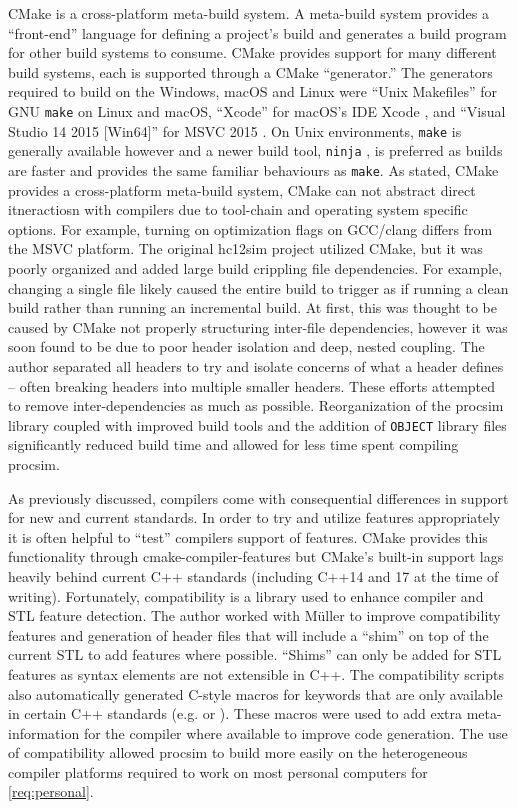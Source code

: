 CMake \cite{Kitware:CMake} is a cross-platform meta-build system. A meta-build system provides a ``front-end'' language for defining a project's build and generates a build program for other build systems to consume. CMake provides support for many different build systems, each is supported through a CMake ``generator.'' The generators required to build on the Windows, macOS and Linux were ``Unix Makefiles'' for GNU \texttt{make} \cite{GNU:Make} on Linux and macOS, ``Xcode'' for macOS's IDE Xcode \cite{Apple:Xcode}, and ``Visual Studio 14 2015 [Win64]'' for MSVC 2015 \cite{CMake:Generators}. On Unix environments, \texttt{make} is generally available however and a newer build tool, \texttt{ninja} \cite{NinjaBuild}, is preferred as builds are faster and provides the same familiar behaviours as \texttt{make}. As stated, CMake provides a cross-platform meta-build system, CMake can not abstract direct itneractiosn with compilers due to tool-chain and operating system specific options. For example, turning on optimization flags on GCC/clang differs from the MSVC platform. The original hc12sim project utilized CMake, but it was poorly organized and added large build crippling file dependencies. For example, changing a single file likely caused the entire build to trigger as if running a clean build rather than running an incremental build. At first, this was thought to be caused by CMake not properly structuring inter-file dependencies, however it was soon found to be due to poor header isolation and deep, nested coupling. The author separated all headers to try and isolate concerns of what a header defines -- often breaking headers into multiple smaller headers. These efforts attempted to remove inter-dependencies as much as possible. Reorganization of the procsim library coupled with improved build tools and the addition of \texttt{OBJECT} library files \cite{CMake:add_library} significantly reduced build time and allowed for less time spent compiling procsim. 

As previously discussed, compilers come with consequential differences in support for new and current standards. In order to try and utilize features appropriately it is often helpful to ``test'' compilers support of features. CMake provides this functionality through cmake-compiler-features \cite{CMake:compile-features} but CMake's built-in support lags heavily behind current C++ standards (including C++14 and 17 at the time of writing). Fortunately, compatibility \cite{CMakeCompatibility} is a library used to enhance compiler and STL feature detection. The author worked with M\"uller to improve compatibility features and generation of header files that will include a ``shim'' on top of the current STL to add features where possible. ``Shims'' can only be added for STL features as syntax elements are not extensible in C++. The compatibility scripts also automatically generated C-style macros for keywords that are only available in certain C++ standards (e.g.  or ). These macros were used to add extra meta-information for the compiler where available to improve code generation. The use of compatibility allowed procsim to build more easily on the heterogeneous compiler platforms required to work on most personal computers for \cref{req:personal}. 

